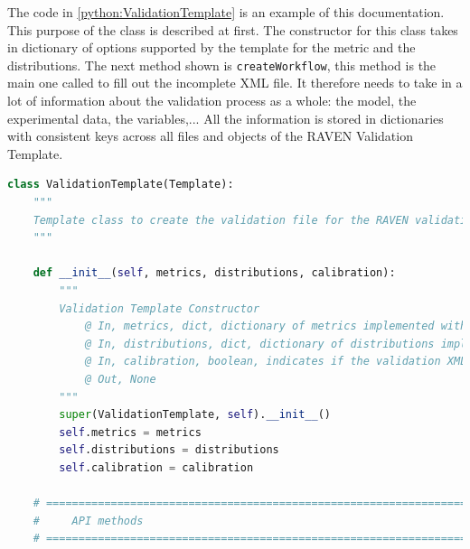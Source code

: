 \documentclass[oneside]{book}
\begin{document}
The code in \ref{python:ValidationTemplate} is an example of this documentation. This purpose of the class is described at first. The constructor for this class takes in dictionary of options supported by the template for the metric and the distributions. The next method shown is \verb|createWorkflow|, this method is the main one called to fill out the incomplete XML file. It therefore needs to take in a lot of information about the validation process as a whole: the model, the experimental data, the variables,... All the information is stored in dictionaries with consistent keys across all files and objects of the RAVEN Validation Template. 

\begin{lstlisting}[language=Python, caption={Validation Template Class}, label={python:ValidationTemplate}]
class ValidationTemplate(Template):
    """
    Template class to create the validation file for the RAVEN validation template
    """

    def __init__(self, metrics, distributions, calibration):
        """ 
        Validation Template Constructor 
            @ In, metrics, dict, dictionary of metrics implemented with information
            @ In, distributions, dict, dictionary of distributions implemented with information
            @ In, calibration, boolean, indicates if the validation XML file will be used for calibration
            @ Out, None 
        """
        super(ValidationTemplate, self).__init__()
        self.metrics = metrics
        self.distributions = distributions
        self.calibration = calibration
    
    # =============================================================================
    #     API methods
    # =============================================================================
    

\end{lstlisting}
\end{document}
